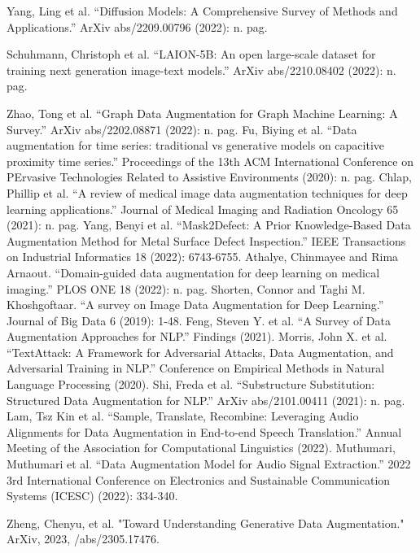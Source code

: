 \documentclass[preprint,12pt,authoryear]{elsarticle}
\begin{document}
\begin{thebibliography}{00}
Yang, Ling et al. “Diffusion Models: A Comprehensive Survey of Methods and Applications.” ArXiv abs/2209.00796 (2022): n. pag.

Schuhmann, Christoph et al. “LAION-5B: An open large-scale dataset for training next generation image-text models.” ArXiv abs/2210.08402 (2022): n. pag.

Zhao, Tong et al. “Graph Data Augmentation for Graph Machine Learning: A Survey.” ArXiv abs/2202.08871 (2022): n. pag.
Fu, Biying et al. “Data augmentation for time series: traditional vs generative models on capacitive proximity time series.” Proceedings of the 13th ACM International Conference on PErvasive Technologies Related to Assistive Environments (2020): n. pag.
Chlap, Phillip et al. “A review of medical image data augmentation techniques for deep learning applications.” Journal of Medical Imaging and Radiation Oncology 65 (2021): n. pag.
Yang, Benyi et al. “Mask2Defect: A Prior Knowledge-Based Data Augmentation Method for Metal Surface Defect Inspection.” IEEE Transactions on Industrial Informatics 18 (2022): 6743-6755.
Athalye, Chinmayee and Rima Arnaout. “Domain-guided data augmentation for deep learning on medical imaging.” PLOS ONE 18 (2022): n. pag.
Shorten, Connor and Taghi M. Khoshgoftaar. “A survey on Image Data Augmentation for Deep Learning.” Journal of Big Data 6 (2019): 1-48.
Feng, Steven Y. et al. “A Survey of Data Augmentation Approaches for NLP.” Findings (2021).
Morris, John X. et al. “TextAttack: A Framework for Adversarial Attacks, Data Augmentation, and Adversarial Training in NLP.” Conference on Empirical Methods in Natural Language Processing (2020).
Shi, Freda et al. “Substructure Substitution: Structured Data Augmentation for NLP.” ArXiv abs/2101.00411 (2021): n. pag.
Lam, Tsz Kin et al. “Sample, Translate, Recombine: Leveraging Audio Alignments for Data Augmentation in End-to-end Speech Translation.” Annual Meeting of the Association for Computational Linguistics (2022).
Muthumari, Muthumari et al. “Data Augmentation Model for Audio Signal Extraction.” 2022 3rd International Conference on Electronics and Sustainable Communication Systems (ICESC) (2022): 334-340.

Zheng, Chenyu, et al. "Toward Understanding Generative Data Augmentation." ArXiv, 2023, /abs/2305.17476. 


\end{thebibliography}
\end{document}
